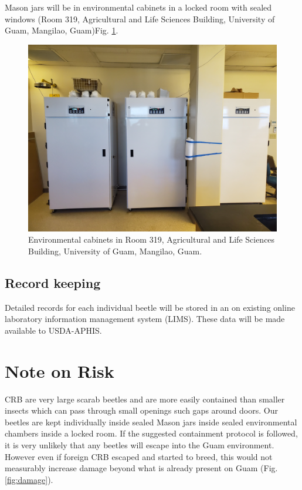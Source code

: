 \documentclass[12pt,english,letterpaper]{scrartcl}
\begin{document}
Mason jars will be in environmental cabinets in a locked room with sealed windows (Room 319, Agricultural and Life Sciences Building, University of Guam, Mangilao, Guam)Fig. \ref{fig:cabinets}.
\begin{figure}[h]
	\includegraphics[width=\textwidth]{cabinets.jpg}
	\caption{Environmental cabinets in Room 319, Agricultural and Life Sciences Building, University of Guam, Mangilao, Guam.}
	\label{fig:cabinets}
\end{figure}
	
\subsection{Record keeping}
Detailed records for each individual beetle will be stored in an on existing online laboratory information management system (LIMS). These data will be made available to USDA-APHIS.

\section{Note on Risk}

CRB are very large scarab beetles and are more easily contained than smaller insects which can pass through small openings such gaps around doors. Our beetles are kept individually inside sealed Mason jars inside sealed environmental chambers inside a locked room. If the suggested containment protocol is followed, it is very unlikely that any beetles will escape into the Guam environment. However even if foreign CRB escaped and started to breed, this would not measurably increase damage beyond what is already present on Guam (Fig. \ref{fig:damage}).
\end{document}

